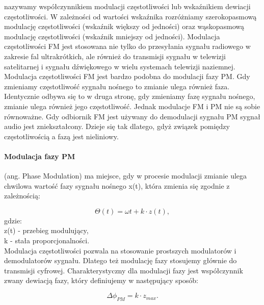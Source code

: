 \documentclass[a4paper,twoside]{report}
\begin{document}
nazywamy współczynnikiem modulacji częstotliwości lub wskaźnikiem dewiacji częstotliwości. W zależności od wartości wskaźnika rozróżniamy szerokopasmową modulację częstotliwości (wskaźnik większy od jedności) oraz wąskopasmową modulację częstotliwości (wskaźnik mniejszy od jedności). Modulacja częstotliwości FM jest stosowana nie tylko do przesyłania sygnału radiowego w zakresie fal ultrakrótkich, ale również do transmisji sygnału w telewizji satelitarnej i sygnału dźwiękowego w wielu systemach telewizji naziemnej. Modulacja częstotliwości FM jest bardzo podobna do modulacji fazy PM. Gdy zmieniamy częstotliwość sygnału nośnego to zmianie ulega również faza. Identycznie odbywa się to w druga stronę, gdy zmieniamy fazę sygnału nośnego, zmianie ulega również jego częstotliwość. Jednak modulacje FM i PM nie są sobie równoważne. Gdy odbiornik FM jest używany do demodulacji sygnału PM sygnał audio jest zniekształcony. Dzieje się tak dlatego, gdyż związek pomiędzy częstotliwością a fazą jest nieliniowy. 

\paragraph{Modulacja fazy PM} (ang. Phase Modulation) ma miejsce, gdy w procesie modulacji zmianie ulega chwilowa wartość fazy sygnału nośnego x(t), która zmienia się zgodnie z zależnością:

\begin{equation}
\Theta (t)=\omega t+k\cdot z(t),
\end{equation}
gdzie: \\
z(t) - przebieg modulujący,\\
k - stała proporcjonalności. \\

Modulacja częstotliwości pozwala na stosowanie prostszych modulatorów i demodulatorów sygnału. Dlatego też modulację fazy stosujemy głównie do transmisji cyfrowej. Charakterystyczny dla modulacji fazy jest współczynnik zwany dewiacją fazy, który definiujemy w następujący sposób:

\begin{equation}
\Delta \phi _{PM}= k\cdot z_{max}.
\end{equation}
\end{document}
